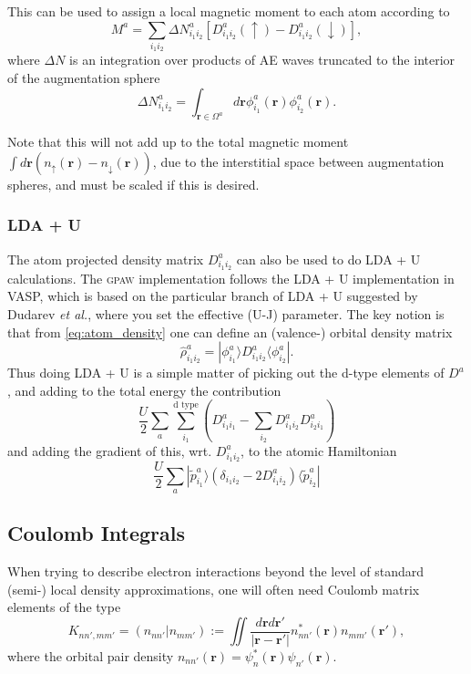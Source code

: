 \documentclass[a4paper]{article}
\newcommand{\gpaw}{\textsc{gpaw}}
\newcommand{\s}[1]{\tilde{#1}}
\newcommand{\br}{\mathbf{r}}
\newcommand{\rr}{|\mathbf{r} - \mathbf{r}'|}
\newcommand{\bra}[1]{\langle #1 |}
\newcommand{\ket}[1]{| #1 \rangle}
\begin{document}
This can be used to assign a local magnetic moment to each atom according to
\begin{equation*}
  M^a = \sum_{i_1i_2} \Delta N^a_{i_1i_2} \left[ D^a_{i_1i_2}(\uparrow) - D^a_{i_1i_2}(\downarrow) \right],
\end{equation*}
where $\Delta N$ is an integration over products of AE waves truncated
to the interior of the augmentation sphere
\begin{equation*}
  \Delta N^a_{i_1i_2} = \int_{\br \in \Omega^a} d\br \phi_{i_1}^a(\br)\phi_{i_2}^a(\br).
\end{equation*}

Note that this will not add up to the total magnetic moment $\int d\br
(n_\uparrow(\br) - n_\downarrow(\br))$, due to the interstitial space
between augmentation spheres, and must be scaled if this is desired.

\subsubsection{LDA + U}
The atom projected density matrix $D^a_{i_1i_2}$ can also be used to
do LDA + U calculations. The \gpaw{} implementation follows the LDA + U
implementation in VASP\cite{Rohrbach2004}, which is based on the
particular branch of LDA + U suggested by Dudarev \emph{et
  al.}\cite{Dudarev1998}, where you set the effective (U-J) parameter.
The key notion is that from \ref{eq:atom_density} one can define an
(valence-) orbital density matrix
\begin{equation*}
  \hat{\rho}_{i_1i_2}^a = \ket{\phi_{i_1}^a} D^a_{i_1i_2} \bra{\phi_{i_2}^a}.
\end{equation*}
Thus doing LDA + U is a simple matter of picking out the d-type
elements of $D^a$, and adding to the total energy the contribution
\begin{equation}
  \label{eq:hubbard energy}
  \frac{U}{2} \sum_a \sum_{i_1}^\text{d type} \left(D^a_{i_1i_1} - \sum_{i_2} D^a_{i_1i_2} D^a_{i_2i_1} \right)
\end{equation}
and adding the gradient of this, wrt. $D_{i_1i_2}^a$, to the atomic Hamiltonian
\begin{equation}
  \label{eq:hubbard hamiltonian}
  \frac{U}{2} \sum_a \ket{\s{p}_{i_1}^a} \left( \delta_{i_1i_2} - 2 D^a_{i_1i_2} \right)\bra{\s{p}_{i_2}^a}
\end{equation}

\subsection{Coulomb Integrals}
When trying to describe electron interactions beyond the level of
standard (semi-) local density approximations, one will often need
Coulomb matrix elements of the type
\begin{equation}
  \label{eq:coulomb-matrix}
  K_{nn',mm'} = (n_{nn'} | n_{mm'}) := \iint \frac{d\br d\br'}{\rr} n^*_{nn'}(\br)n_{mm'}(\br'),
\end{equation}
where the orbital pair density $n_{nn'}(\br) =
\psi_n^*(\br)\psi_{n'}(\br)$.
\end{document}
